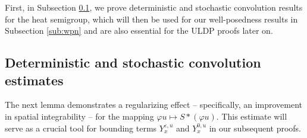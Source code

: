 \documentclass{amsart}
\theoremstyle{plain}
\theoremstyle{remark}
\theoremstyle{plain}
\numberwithin{equation}{section}
\newcommand{\eps}{\varepsilon}
\begin{document}
First, in Subsection \ref{sub:convolution estimates}, we prove  deterministic and stochastic convolution results for the heat semigroup, which will then be used for our well-posedness results in Subsection \ref{sub:wpn} and are also essential for the ULDP proofs later on. 

\subsection{Deterministic and stochastic convolution estimates}\label{sub:convolution estimates}


 
The next lemma demonstrates a regularizing effect -- specifically, an improvement in spatial integrability -- for the mapping $\varphi u\mapsto S*(\varphi u)$. This estimate will serve as a crucial tool for bounding terms $Y_x^{\eps,u}$ and $Y_x^{0,u}$ in our subsequent proofs. 
 
\end{document}
